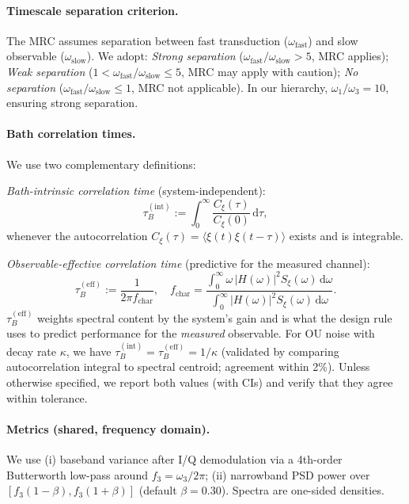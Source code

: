 \documentclass[11pt,letterpaper]{article}
\begin{document}
\paragraph*{Timescale separation criterion.}
The MRC assumes separation between fast transduction ($\omega_{\mathrm{fast}}$) and slow observable ($\omega_{\mathrm{slow}}$). We adopt: \emph{Strong separation} ($\omega_{\mathrm{fast}}/\omega_{\mathrm{slow}} > 5$, MRC applies); \emph{Weak separation} ($1 < \omega_{\mathrm{fast}}/\omega_{\mathrm{slow}} \le 5$, MRC may apply with caution); \emph{No separation} ($\omega_{\mathrm{fast}}/\omega_{\mathrm{slow}} \le 1$, MRC not applicable). In our hierarchy, $\omega_1/\omega_3 = 10$, ensuring strong separation.

\paragraph*{Bath correlation times.}
We use two complementary definitions:

\emph{Bath-intrinsic correlation time} (system-independent):
\[
\tau_B^{(\mathrm{int})} := \int_0^\infty \frac{C_\xi(\tau)}{C_\xi(0)}\,\mathrm{d}\tau,
\]
whenever the autocorrelation $C_\xi(\tau)=\langle\xi(t)\xi(t-\tau)\rangle$ exists and is integrable.

\emph{Observable-effective correlation time} (predictive for the measured channel):
\[
\tau_B^{(\mathrm{eff})} := \frac{1}{2\pi f_{\mathrm{char}}},\quad
f_{\mathrm{char}} = \frac{\int_0^\infty \omega\, |H(\omega)|^2 S_\xi(\omega)\,\mathrm{d}\omega}
{\int_0^\infty |H(\omega)|^2 S_\xi(\omega)\,\mathrm{d}\omega}.
\]
$\tau_B^{(\mathrm{eff})}$ weights spectral content by the system's gain and is what the design rule uses to predict performance for the \emph{measured} observable. For OU noise with decay rate $\kappa$, we have $\tau_B^{(\mathrm{int})}=\tau_B^{(\mathrm{eff})}=1/\kappa$ (validated by comparing autocorrelation integral to spectral centroid; agreement within 2\%). Unless otherwise specified, we report both values (with CIs) and verify that they agree within tolerance.

\paragraph*{Metrics (shared, frequency domain).}
We use (i) baseband variance after I/Q demodulation via a 4th-order Butterworth low-pass around $f_3=\omega_3/2\pi$; (ii) narrowband PSD power over $[f_3(1-\beta),f_3(1+\beta)]$ (default $\beta=0.30$). Spectra are one-sided densities.
\end{document}
